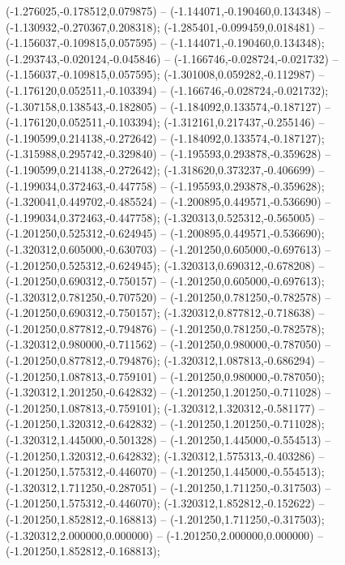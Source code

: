  (-1.276025,-0.178512,0.079875) -- (-1.144071,-0.190460,0.134348) -- (-1.130932,-0.270367,0.208318);
 (-1.285401,-0.099459,0.018481) -- (-1.156037,-0.109815,0.057595) -- (-1.144071,-0.190460,0.134348);
 (-1.293743,-0.020124,-0.045846) -- (-1.166746,-0.028724,-0.021732) -- (-1.156037,-0.109815,0.057595);
 (-1.301008,0.059282,-0.112987) -- (-1.176120,0.052511,-0.103394) -- (-1.166746,-0.028724,-0.021732);
 (-1.307158,0.138543,-0.182805) -- (-1.184092,0.133574,-0.187127) -- (-1.176120,0.052511,-0.103394);
 (-1.312161,0.217437,-0.255146) -- (-1.190599,0.214138,-0.272642) -- (-1.184092,0.133574,-0.187127);
 (-1.315988,0.295742,-0.329840) -- (-1.195593,0.293878,-0.359628) -- (-1.190599,0.214138,-0.272642);
 (-1.318620,0.373237,-0.406699) -- (-1.199034,0.372463,-0.447758) -- (-1.195593,0.293878,-0.359628);
 (-1.320041,0.449702,-0.485524) -- (-1.200895,0.449571,-0.536690) -- (-1.199034,0.372463,-0.447758);
 (-1.320313,0.525312,-0.565005) -- (-1.201250,0.525312,-0.624945) -- (-1.200895,0.449571,-0.536690);
 (-1.320312,0.605000,-0.630703) -- (-1.201250,0.605000,-0.697613) -- (-1.201250,0.525312,-0.624945);
 (-1.320313,0.690312,-0.678208) -- (-1.201250,0.690312,-0.750157) -- (-1.201250,0.605000,-0.697613);
 (-1.320312,0.781250,-0.707520) -- (-1.201250,0.781250,-0.782578) -- (-1.201250,0.690312,-0.750157);
 (-1.320312,0.877812,-0.718638) -- (-1.201250,0.877812,-0.794876) -- (-1.201250,0.781250,-0.782578);
 (-1.320312,0.980000,-0.711562) -- (-1.201250,0.980000,-0.787050) -- (-1.201250,0.877812,-0.794876);
 (-1.320312,1.087813,-0.686294) -- (-1.201250,1.087813,-0.759101) -- (-1.201250,0.980000,-0.787050);
 (-1.320312,1.201250,-0.642832) -- (-1.201250,1.201250,-0.711028) -- (-1.201250,1.087813,-0.759101);
 (-1.320312,1.320312,-0.581177) -- (-1.201250,1.320312,-0.642832) -- (-1.201250,1.201250,-0.711028);
 (-1.320312,1.445000,-0.501328) -- (-1.201250,1.445000,-0.554513) -- (-1.201250,1.320312,-0.642832);
 (-1.320312,1.575313,-0.403286) -- (-1.201250,1.575312,-0.446070) -- (-1.201250,1.445000,-0.554513);
 (-1.320312,1.711250,-0.287051) -- (-1.201250,1.711250,-0.317503) -- (-1.201250,1.575312,-0.446070);
 (-1.320312,1.852812,-0.152622) -- (-1.201250,1.852812,-0.168813) -- (-1.201250,1.711250,-0.317503);
 (-1.320312,2.000000,0.000000) -- (-1.201250,2.000000,0.000000) -- (-1.201250,1.852812,-0.168813);
